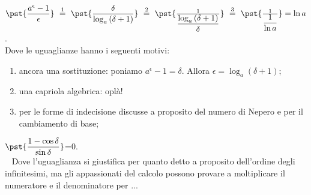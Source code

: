 \begin{esempio}
\(\pst{\dfrac{a^\epsilon-1}{\epsilon}}
~ \stackrel{1}{=} ~  
\pst{\dfrac{\delta}{\log_a{(\delta+1)}}}
~ \stackrel{2}{=} ~
\pst{\frac{1}{\dfrac{\log_a{(\delta+1)}}{\delta}}}
~ \stackrel{3}{=} ~ 
\pst{\frac{1}{\dfrac{1}{\ln{a}}}}=\ln{a}\).\\

Dove le uguaglianze hanno i seguenti motivi:
\begin{enumerate} [nosep]
 \item ancora una sostituzione: poniamo
\(a^\epsilon-1=\delta\). Allora \(\epsilon=\log_a(\delta+1)\);
 \item una capriola algebrica: oplà! 
 \item per le forme di indecisione discusse a proposito del numero di Nepero
e per il cambiamento di base;
\end{enumerate}
\end{esempio}

\begin{esempio}
 \(\pst{\dfrac{1-\cos \delta}{\sin \delta}}\)=0.\\
~
Dove l'uguaglianza si giustifica per quanto detto a proposito dell'ordine 
degli infinitesimi, ma gli appassionati del calcolo possono provare a 
moltiplicare il numeratore e il denominatore per ...
\end{esempio}




































